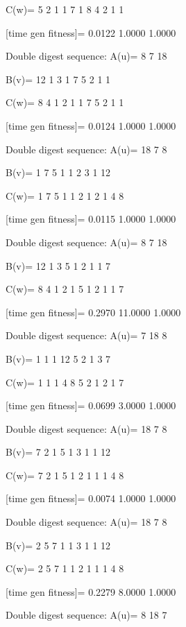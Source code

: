 C(w)=
     5     2     1     1     7     1     8     4     2     1     1

[time gen fitness]=
    0.0122    1.0000    1.0000

Double digest sequence:
A(u)=
     8     7    18

B(v)=
    12     1     3     1     7     5     2     1     1

C(w)=
     8     4     1     2     1     1     7     5     2     1     1

[time gen fitness]=
    0.0124    1.0000    1.0000

Double digest sequence:
A(u)=
    18     7     8

B(v)=
     1     7     5     1     1     2     3     1    12

C(w)=
     1     7     5     1     1     2     1     2     1     4     8

[time gen fitness]=
    0.0115    1.0000    1.0000

Double digest sequence:
A(u)=
     8     7    18

B(v)=
    12     1     3     5     1     2     1     1     7

C(w)=
     8     4     1     2     1     5     1     2     1     1     7

[time gen fitness]=
    0.2970   11.0000    1.0000

Double digest sequence:
A(u)=
     7    18     8

B(v)=
     1     1     1    12     5     2     1     3     7

C(w)=
     1     1     1     4     8     5     2     1     2     1     7

[time gen fitness]=
    0.0699    3.0000    1.0000

Double digest sequence:
A(u)=
    18     7     8

B(v)=
     7     2     1     5     1     3     1     1    12

C(w)=
     7     2     1     5     1     2     1     1     1     4     8

[time gen fitness]=
    0.0074    1.0000    1.0000

Double digest sequence:
A(u)=
    18     7     8

B(v)=
     2     5     7     1     1     3     1     1    12

C(w)=
     2     5     7     1     1     2     1     1     1     4     8

[time gen fitness]=
    0.2279    8.0000    1.0000

Double digest sequence:
A(u)=
     8    18     7

